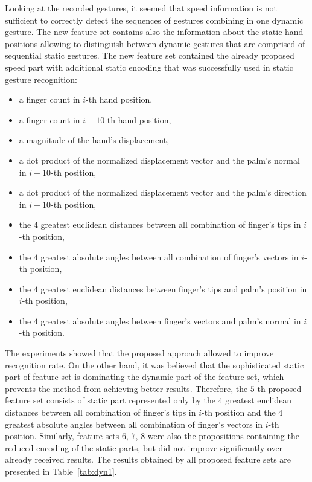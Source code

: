 Looking at the recorded gestures, it seemed that speed information is not sufficient to correctly detect the sequences of gestures combining in one dynamic gesture.
The new feature set contains also the information about the static hand positions allowing to distinguish between dynamic gestures that are comprised of sequential static gestures.
The new feature set contained the already proposed speed part with additional static encoding that was successfully used in static gesture recognition:
\begin{itemize}
\item a finger count in $i$-th hand position,
\item a finger count in $i-10$-th hand position,
\item a magnitude of the hand's displacement,
\item a dot product of the normalized displacement vector and the palm's normal in $i-10$-th position,
\item a dot product of the normalized displacement vector and the palm's direction in $i-10$-th position,
\item the $4$ greatest euclidean distances between all combination of finger's tips in $i$-th position,
\item the $4$ greatest absolute angles between all combination of finger's vectors in $i$-th position,
\item the $4$ greatest euclidean distances between finger's tips and palm's position in $i$-th position,
\item the $4$ greatest absolute angles between finger's vectors and palm's normal in $i$-th position.
\end{itemize}

The experiments showed that the proposed approach allowed to improve recognition rate.
On the other hand, it was believed that the sophisticated static part of feature set is dominating the dynamic part of the feature set, which prevents the method from achieving better results.
Therefore, the $5$-th proposed feature set consists of static part represented only by the $4$ greatest euclidean distances between all combination of finger's tips in $i$-th position and the $4$ greatest absolute angles between all combination of finger's vectors in $i$-th position.
Similarly, feature sets $6$, $7$, $8$ were also the propositions containing the reduced encoding of the static parts, but did not improve significantly over already received results. 
The results obtained by all proposed feature sets are presented in Table~\ref{tab:dyn1}. 

